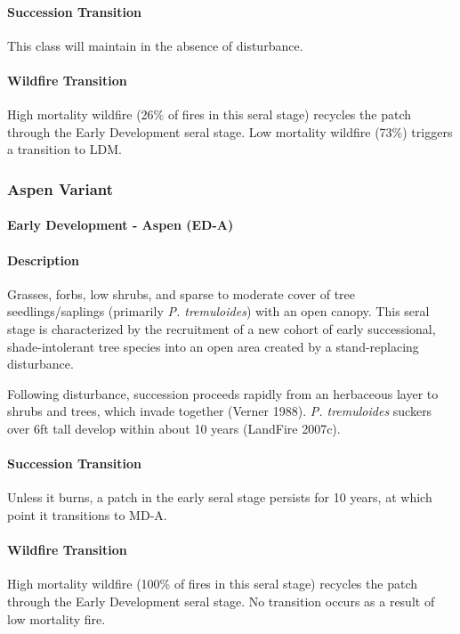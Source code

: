 \paragraph{Succession Transition} This class will maintain in the absence of disturbance.

\paragraph{Wildfire Transition} High mortality wildfire (26\% of fires in this seral stage) recycles the patch through the Early Development seral stage. Low mortality wildfire (73\%) triggers a transition to LDM.

\noindent\hrulefill
\noindent\hrulefill

\subsubsection{Aspen Variant}

\paragraph{Early Development - Aspen (ED-A)}

\paragraph{Description} Grasses, forbs, low shrubs, and sparse to moderate cover of tree seedlings/saplings (primarily \emph{P. tremuloides}) with an open canopy. This seral stage is characterized by the recruitment of a new cohort of early successional, shade-intolerant tree species into an open area created by a stand-replacing disturbance. 

Following disturbance, succession proceeds rapidly from an herbaceous layer to shrubs and trees, which invade together (Verner 1988). \emph{P. tremuloides} suckers over 6ft tall develop within about 10 years (LandFire 2007c). 


\paragraph{Succession Transition} Unless it burns, a patch in the early seral stage persists for 10 years, at which point it transitions to MD-A.

\paragraph{Wildfire Transition} High mortality wildfire (100\% of fires in this seral stage) recycles the patch through the Early Development seral stage. No transition occurs as a result of low mortality fire.

